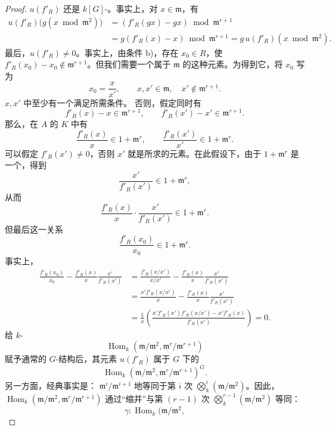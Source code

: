 \begin{proof}
 $u(f'_R)$ 还是 $k[G]$-。事实上，对 $x\in\mathfrak m$，有
\[
\begin{aligned}
u(f'_R)\bigl(g(x\bmod\mathfrak m^2)\bigr)
 &=(f'_R(gx)-gx)\bmod\mathfrak m^{r+1}\\
 &=g(f'_R(x)-x)\bmod\mathfrak m^{r+1}
 =g\,u(f'_R)(x\bmod\mathfrak m^2).
\end{aligned}
\]
最后，$u(f'_R)\ne0$。事实上，由条件 b)，存在 $x_0\in R$，使
$f'_R(x_0)-x_0\notin\mathfrak m^{r+1}$。但我们需要一个属于 $\mathfrak m$ 的这种元素。为得到它，将 $x_0$ 写为
\[
x_0=\frac{x}{x'},\qquad x,x'\in\mathfrak m,\quad x'\notin\mathfrak m^{r+1}.
\]
$x,x'$ 中至少有一个满足所需条件。
否则，假定同时有
\[
f'_R(x)-x\in\mathfrak m^{r+1},\qquad
f'_R(x')-x'\in\mathfrak m^{r+1}.
\]
那么，在 $A$ 的 $K$ 中有
\[
\frac{f'_R(x)}x\in1+\mathfrak m^r,\qquad
\frac{f'_R(x')}{x'}\in1+\mathfrak m^r.
\]
可以假定 $f'_R(x')\ne0$，否则 $x'$ 就是所求的元素。在此假设下，由于 $1+\mathfrak m^r$ 是一个，得到
\[
\frac{x'}{f'_R(x')}\in1+\mathfrak m^r,
\]
从而
\[
\frac{f'_R(x)}x\cdot\frac{x'}{f'_R(x')}\in1+\mathfrak m^r.
\]
但最后这一关系
\[
\frac{f'_R(x_0)}{x_0}\in1+\mathfrak m^r.
\]
事实上，
\[
\begin{aligned}
\frac{f'_R(x_0)}{x_0}-\frac{f'_R(x)}x\frac{x'}{f'_R(x')}
 &=\frac{f'_R(x/x')}{x/x'}-\frac{f'_R(x)}x\frac{x'}{f'_R(x')}\\
 &=\frac{x'f'_R(x/x')}{x}-\frac{f'_R(x)}x\frac{x'}{f'_R(x')}\\
 &=\frac1x\left(
 \frac{x'f'_R(x')f'_R(x/x')-x'f'_R(x)}{f'_R(x')}
 \right)=0.
\end{aligned}
\]
给 $k$-
\[
\operatorname{Hom}_k(\mathfrak m/\mathfrak m^2,
 \mathfrak m^r/\mathfrak m^{r+1})
\]
赋予通常的 $G$-结构后，其元素 $u(f'_R)$ 属于 $G$ 下的
\[
\operatorname{Hom}_k(\mathfrak m/\mathfrak m^2,
 \mathfrak m^r/\mathfrak m^{r+1})^G.
\]
另一方面，经典事实是： $\mathfrak m^i/\mathfrak m^{i+1}$ 地等同于第 $i$ 次
$\bigotimes_k^i(\mathfrak m/\mathfrak m^2)$。因此，
$\operatorname{Hom}_k(\mathfrak m/\mathfrak m^2,\mathfrak m^r/\mathfrak m^{r+1})$
通过“缩并”与第 $(r-1)$ 次
$\bigotimes_k^{r-1}(\mathfrak m/\mathfrak m^2)$ 等同：
\[
\gamma:\operatorname{Hom}_k(\mathfrak m/\mathfrak m^2,
\]
\end{proof}
